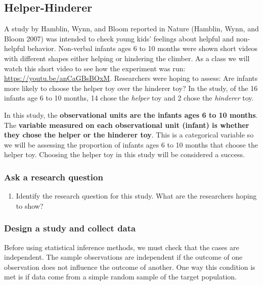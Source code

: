 \documentclass[
]{report}
\providecommand{\tightlist}{%
  \setlength{\itemsep}{0pt}\setlength{\parskip}{0pt}}
\begin{document}
\subsection{Helper-Hinderer}\label{helper-hinderer}

A study by Hamblin, Wynn, and Bloom reported in Nature (Hamblin, Wynn, and Bloom 2007) was intended to check young kids' feelings about helpful and non-helpful behavior. Non-verbal infants ages 6 to 10 months were shown short videos with different shapes either helping or hindering the climber. As a class we will watch this short video to see how the experiment was run: \url{https://youtu.be/anCaGBsBOxM}. Researchers were hoping to assess: Are infants more likely to choose the helper toy over the hinderer toy? In the study, of the 16 infants age 6 to 10 months, 14 chose the \emph{helper} toy and 2 chose the \emph{hinderer} toy.

In this study, the \textbf{observational units are the infants ages 6 to 10 months}. The \textbf{variable measured on each observational unit (infant) is whether they chose the helper or the hinderer toy}. This is a categorical variable so we will be assessing the proportion of infants ages 6 to 10 months that choose the helper toy. Choosing the helper toy in this study will be considered a success.

\subsubsection*{Ask a research question}\label{ask-a-research-question}

\begin{enumerate}
\def\labelenumi{\arabic{enumi}.}
\tightlist
\item
  Identify the research question for this study. What are the researchers hoping to show?
\end{enumerate}

\vspace{0.6in}

\subsubsection*{Design a study and collect data}\label{design-a-study-and-collect-data}

Before using statistical inference methods, we must check that the cases are independent. The sample observations are independent if the outcome of one observation does not influence the outcome of another. One way this condition is met is if data come from a simple random sample of the target population.
\end{document}
